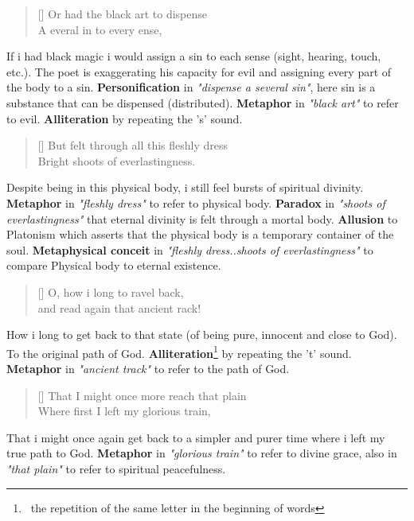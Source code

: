 \documentclass[12pt, a4paper]{article}
\begin{document}
\begin{verse}[\versewidth]
{\fontverse
Or had the black art to dispense\\
A everal in to every ense, 
} 
\end{verse}

If i had black magic i would assign a sin to each sense (sight, hearing, touch, etc.).
The poet is exaggerating his capacity for evil and assigning every part of the body to a sin.
\textbf{Personification} in \textit{"dispense a several sin"}, here sin is a substance that
can be dispensed (distributed). \textbf{Metaphor} in \textit{"black art"} to refer
to evil. \textbf{Alliteration} by repeating the 's' sound.

\newpage
\begin{verse}[\versewidth]
{\fontverse
But felt through all this fleshly dress\\
Bright shoots of everlastingness.
} 
\end{verse}

Despite being in this physical body, i still feel bursts of spiritual divinity.
 \textbf{Metaphor} in \textit{"fleshly dress"} to refer to physical body.
 \textbf{Paradox} in \textit{"shoots of everlastingness"} that eternal divinity is
felt through a mortal body. \textbf{Allusion} to Platonism which asserts
that the physical body is a temporary container of the soul. \textbf{Metaphysical conceit} 
in \textit{"fleshly dress..shoots of everlastingness"} to compare 
Physical body to eternal existence.


\begin{verse}[\versewidth]
{\fontverse
O, how i long to ravel back,\\
and read again that ancient rack!
} 
\end{verse}

How i long to get back to that state (of being pure, innocent and close to God).
To the original path of God. \textbf{Alliteration}\footnote{\, 
the repetition of the same letter in the beginning of words} by repeating the 't' sound.
\textbf{Metaphor} in \textit{"ancient track"} to refer to the path of God.

\begin{verse}[\versewidth]
{\fontverse
That I might once more reach that plain\\
Where first I left my glorious train, 
} 
\end{verse}

That i might once again get back to a simpler and purer time
where i left my true path to God. \textbf{Metaphor} in \textit{"glorious train"} 
to refer to divine grace, also in \textit{"that plain"} to refer to spiritual peacefulness.
\end{document}
